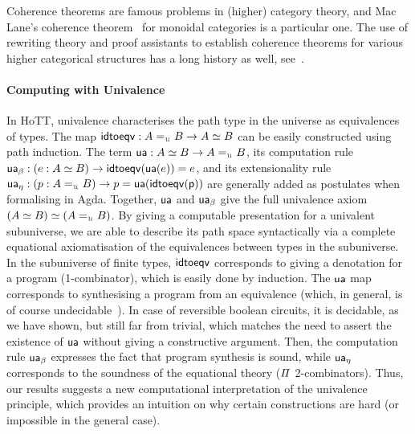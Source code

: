 Coherence theorems are famous problems in (higher) category theory, and Mac Lane's coherence
theorem~\cite{maclaneNaturalAssociativityCommutativity1963,joyalBraidedTensorCategories1993,gurskiInfiniteLoopSpaces2013}
for monoidal categories is a particular one. The use of rewriting theory and proof assistants to establish coherence
theorems for various higher categorical structures has a long history as well,
see~\cite*{forestCoherenceGrayCategories2018,beylinExtractingProofCoherence1996}.

\paragraph{Computing with Univalence} In HoTT, univalence characterises the path type in the universe as equivalences of
types. The map $\term{idtoeqv} : A \id_{\UU} B \to A \eqv B$ can be easily constructed using path induction. The term
$\term{ua} : A \eqv B \to A \id_{\UU} B$, its computation rule
$\term{ua_\beta} : (e : A \eqv B) \to \term{idtoeqv}(\term{ua}(e)) \id e$, and its extensionality rule
$\term{ua_\eta} : (p : A \id_{\UU} B) \to p \id \term{ua}(\term{idtoeqv(p)})$ are generally added as postulates when
formalising in Agda. Together, $\operatorname{\mathsf{ua}}$ and $\operatorname{\mathsf{ua}}_\beta$ give the full univalence axiom
$(A \eqv B) \eqv (A \id_{\UU} B)$.
By giving a computable presentation for a univalent subuniverse, we are able to describe its path space syntactically
via a complete equational axiomatisation of the equivalences between types in the subuniverse.
In the subuniverse of finite types, $\operatorname{\mathsf{idtoeqv}}$ corresponds to giving a denotation for a program (1-combinator),
which is easily done by induction. The $\operatorname{\mathsf{ua}}$ map corresponds to synthesising a program from an equivalence (which,
in general, is of course undecidable~\cite{krogmeierDecidableSynthesisPrograms2020}). In case of reversible boolean
circuits, it is decidable, as we have shown, but still far from trivial, which matches the need to assert the existence
of $\operatorname{\mathsf{ua}}$ without giving a constructive argument. Then, the computation rule $\operatorname{\mathsf{ua_\beta}}$ expresses the fact
that program synthesis is sound, while $\operatorname{\mathsf{ua_\eta}}$ corresponds to the soundness of the equational theory ($\mathit{\Pi}$
2-combinators). Thus, our results suggests a new computational interpretation of the univalence principle, which
provides an intuition on why certain constructions are hard (or impossible in the general case).

